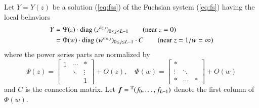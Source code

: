 \documentclass[12pt]{article}
\numberwithin{equation}{section}
\begin{document}
Let $Y=Y(z)$ be a solution 
(\ref{eq:fss}) 
of the Fuchsian system
(\ref{eq:fs})
having the local behaviors
\begin{align*}
Y &=
\Psi (z) \cdot {\rm diag \ }  (z^{\varepsilon_{0,j}})_{0 \leq j \leq L-1} 
\qquad \text{(near $z=0$)}
\\
&=
\Phi (w) \cdot {\rm diag \ }  (w^{\varepsilon_{\infty,j}})_{0 \leq j \leq L-1}
 \cdot C
 \qquad \text{(near $z=1/w=\infty$)}
\end{align*}
where the power series parts are normalized by
\[
\Psi(z)
=
\begin{bmatrix}
1 &  \cdots &*\\  
&\ddots&  \vdots \\
&&1
\end{bmatrix} 
+O(z),
\quad
\Phi(w)
=
\begin{bmatrix}
* &  &\\  
 \vdots&\ddots& \\ 
*& \cdots&*
\end{bmatrix}
+O(w)
\]
and $C$ is the connection matrix.
Let
${\boldsymbol f}={}^{\rm T}(f_0, \ldots,f_{L-1})$
denote the first column of $\Phi(w)$.
\end{document}
